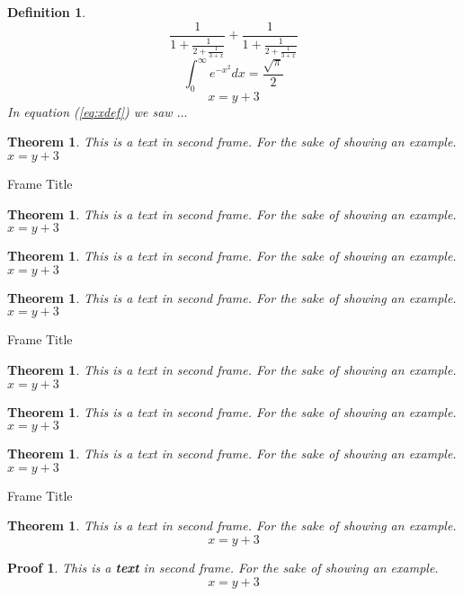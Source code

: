 \documentclass[10pt]{beamer}
\renewcommand{\emph}[1]{\textbf{\color{color5}#1}}
\newtheorem{mysol}{Proof}[section]
\newtheorem{mydef}{Definition}[section]
\newtheorem{mylem}{Theorem}[section]
\newtheorem{mycol}{Theorem}[section]
\newtheorem{myfact}{Theorem}[section]
\newtheorem{mypro}{Theorem}[section]
\newtheorem{mycon}{Theorem}[section]
\newtheorem{myclaim}{Theorem}[section]
\newtheorem{myexa}{Theorem}[section]
\newtheorem{myrem}{Theorem}[section]
\begin{document}
\begin{frame}
  \begin{mydef}
    $$
 \frac{1}{\displaystyle 1+
   \frac{1}{\displaystyle 2+
   \frac{1}{\displaystyle 3+x}}} +
 \frac{1}{1+\frac{1}{2+\frac{1}{3+x}}}
$$
$$\int_0^\infty e^{-x^2} dx=\frac{\sqrt{\pi}}{2}$$
\begin{equation} x=y+3 \label{eq:xdef}
\end{equation}
In equation (\ref{eq:xdef}) we saw $\dots$
  \end{mydef}

  \begin{myrem}
        This is a text in second frame.
        For the sake of showing an example.
        $x=y+3$
  \end{myrem}
  
\end{frame}

\begin{frame}{Frame Title}
    \begin{myexa}
        This is a text in second frame.
        For the sake of showing an example.
        $x=y+3$
    \end{myexa}

    \begin{mycol}
        This is a text in second frame.
        For the sake of showing an example.
        $x=y+3$
    \end{mycol}

    \begin{mylem}
        This is a text in second frame.
        For the sake of showing an example.
        $x=y+3$
    \end{mylem}
\end{frame}

\begin{frame}{Frame Title}
    \begin{myfact}
        This is a text in second frame.
        For the sake of showing an example.
        $x=y+3$
    \end{myfact}

    \begin{mycon}
        This is a text in second frame.
        For the sake of showing an example.
        $x=y+3$
    \end{mycon}

    \begin{mypro}
        This is a text in second frame.
        For the sake of showing an example.
        $x=y+3$
    \end{mypro}
\end{frame}

\begin{frame}{Frame Title}
    \begin{myclaim}
        This is a text in second frame.
        For the sake of showing an example.
        $$x=y+3$$
    \end{myclaim}

    \begin{mysol}
        This is a \emph{text} in second frame.
        For the sake of showing an example.
        $$x=y+3$$
    \end{mysol}
\end{frame}
\end{document}
